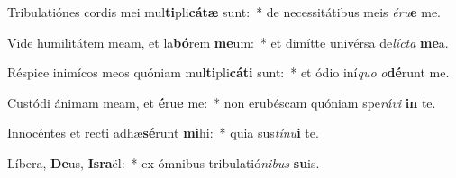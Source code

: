 \item Tribulatiónes cordis mei mul\textbf{ti}pli\textbf{cá}\textbf{tæ} sunt:~* de necessitátibus meis \textit{é}\textit{ru}\textbf{e} me.
\item Vide humilitátem meam, et la\textbf{bó}rem \textbf{me}um:~* et dimítte univérsa de\textit{líc}\textit{ta} \textbf{me}a.
\item Réspice inimícos meos quóniam mul\textbf{ti}pli\textbf{cá}\textbf{ti} sunt:~* et ódio iní\textit{quo} \textit{o}\textbf{dé}runt me.
\item Custódi ánimam meam, et \textbf{é}ru\textbf{e} me:~* non erubéscam quóniam spe\textit{rá}\textit{vi} \textbf{in} te.
\item Innocéntes et recti adhæ\textbf{sé}runt \textbf{mi}hi:~* quia sus\textit{tí}\textit{nu}\textbf{i} te.
\item Líbera, \textbf{De}us, \textbf{Is}\textbf{ra}ël:~* ex ómnibus tribulatió\textit{ni}\textit{bus} \textbf{su}is.
